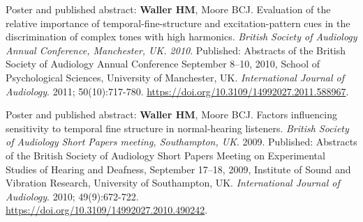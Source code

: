 \documentclass[a4paper, oneside, final, 11pt]{scrartcl} %
\begin{document}
\bigskip

Poster and published abstract: \textbf{Waller HM}, Moore BCJ. Evaluation of the relative importance of temporal-fine-structure and excitation-pattern cues in the discrimination of complex tones with high harmonics. \textit{British Society of Audiology Annual Conference, Manchester, UK. 2010}. Published: Abstracts of the British Society of Audiology Annual Conference September 8--10, 2010, School of Psychological Sciences, University of Manchester, UK. \textit{International Journal of Audiology}. 2011; 50(10):717-780. \url{https://doi.org/10.3109/14992027.2011.588967}.

\bigskip

Poster and published abstract: \textbf{Waller HM}, Moore BCJ. Factors influencing sensitivity to temporal fine structure in normal-hearing listeners. \textit{British Society of Audiology Short Papers meeting, Southampton, UK}. 2009. Published: Abstracts of the British Society of Audiology Short Papers Meeting on Experimental Studies of Hearing and Deafness, September 17--18, 2009, Institute of Sound and Vibration Research, University of Southampton, UK. \textit{International Journal of Audiology}. 2010; 49(9):672-722. \\\url{https://doi.org/10.3109/14992027.2010.490242}.
\end{document}

